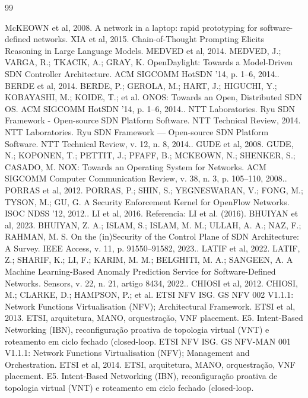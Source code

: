 \documentclass[12pt,a4paper]{article}
\begin{document}
\begin{thebibliography}{99}
\raggedright
{} McKEOWN et al, 2008. A network in a laptop: rapid prototyping for software-defined networks.
 XIA et al, 2015. Chain-of-Thought Prompting Elicits Reasoning in Large Language Models.
 MEDVED et al, 2014. MEDVED, J.; VARGA, R.; TKACIK, A.; GRAY, K. OpenDaylight: Towards a Model-Driven SDN Controller Architecture. ACM SIGCOMM HotSDN '14, p. 1–6, 2014..
 BERDE et al, 2014. BERDE, P.; GEROLA, M.; HART, J.; HIGUCHI, Y.; KOBAYASHI, M.; KOIDE, T.; et al. ONOS: Towards an Open, Distributed SDN OS. ACM SIGCOMM HotSDN '14, p. 1–6, 2014..
 NTT Laboratories. Ryu SDN Framework - Open-source SDN Platform Software. NTT Technical Review, 2014. NTT Laboratories. Ryu SDN Framework — Open-source SDN Platform Software. NTT Technical Review, v. 12, n. 8, 2014..
 GUDE et al, 2008. GUDE, N.; KOPONEN, T.; PETTIT, J.; PFAFF, B.; MCKEOWN, N.; SHENKER, S.; CASADO, M. NOX: Towards an Operating System for Networks. ACM SIGCOMM Computer Communication Review, v. 38, n. 3, p. 105–110, 2008..
 PORRAS et al, 2012. PORRAS, P.; SHIN, S.; YEGNESWARAN, V.; FONG, M.; TYSON, M.; GU, G. A Security Enforcement Kernel for OpenFlow Networks. ISOC NDSS '12, 2012..
 LI et al, 2016. Referencia: LI et al. (2016).
 BHUIYAN et al, 2023. BHUIYAN, Z. A.; ISLAM, S.; ISLAM, M. M.; ULLAH, A. A.; NAZ, F.; RAHMAN, M. S. On the (in)Security of the Control Plane of SDN Architecture: A Survey. IEEE Access, v. 11, p. 91550–91582, 2023..
 LATIF et al, 2022. LATIF, Z.; SHARIF, K.; LI, F.; KARIM, M. M.; BELGHITI, M. A.; SANGEEN, A. A Machine Learning-Based Anomaly Prediction Service for Software-Defined Networks. Sensors, v. 22, n. 21, artigo 8434, 2022..
 CHIOSI et al, 2012. CHIOSI, M.; CLARKE, D.; HAMPSON, P.; et al.
 ETSI NFV ISG. GS NFV 002 V1.1.1: Network Functions Virtualisation (NFV); Architectural Framework. ETSI et al, 2013. ETSI, arquitetura, MANO, orquestração, VNF placement. E5. Intent-Based Networking (IBN), reconfiguração proativa de topologia virtual (VNT) e roteamento em ciclo fechado (closed-loop.
 ETSI NFV ISG. GS NFV-MAN 001 V1.1.1: Network Functions Virtualisation (NFV); Management and Orchestration. ETSI et al, 2014. ETSI, arquitetura, MANO, orquestração, VNF placement. E5. Intent-Based Networking (IBN), reconfiguração proativa de topologia virtual (VNT) e roteamento em ciclo fechado (closed-loop.

\end{thebibliography}
\end{document}
